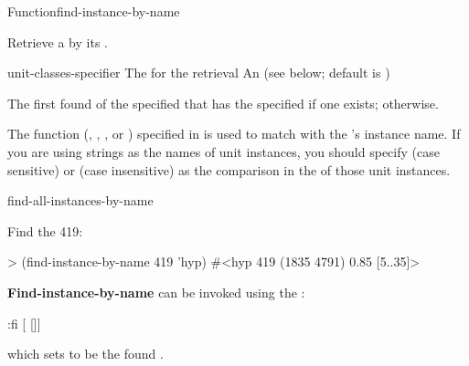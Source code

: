\documentclass[10pt,twoside,english,pdftex]{article}
\begin{document}

\begin{functiondoc}{Function}{find-instance-by-name}{
      
    \returns{} } 
%
%
%

\fnsyntax

\fnpurpose Retrieve a  by its .

\fnpackage {}

\fnmodule {}

\fnargs
\begin{args}{unit-classes-specifier}
 The  for the retrieval
 An 
(see below; default is )
\end{args}

\fnreturns The first  found of the specified
 that has the specified  if one exists;
\nil{} otherwise.

\fndsyntax
\W\supp\tabletop
\unitclassspec
\subclassingspec

\fndescription The  function (,
, , or ) specified in
\textbf{} is used to match 
with the 's instance name.  If you are using strings as
the names of unit instances, you should specify  (case sensitive)
or  (case insensitive) as the comparison  in the
 of those unit instances.

\begin{alsos}{find-all-instances-by-name}
\end{alsos}

\fnexample
Find the   419:
%
\W\supp
\begin{example}
> (find-instance-by-name 419 'hyp)
#<hyp 419 (1835 4791) 0.85 [5..35]>
\end{example}

\fnnote 
%
%
%
\textbf{Find-instance-by-name} can be invoked using the :
%
\W\supp
\begin{example}
  :fi \textrm{[} \textrm{[}\textrm{]]}
\end{example}
%
which sets \code{=} to be the found .

\end{functiondoc}
\end{document}
